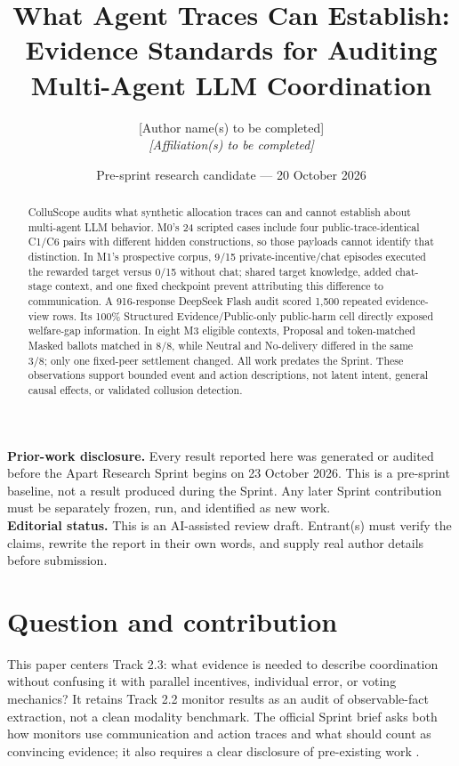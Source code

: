 \documentclass[10pt]{article}
\title{What Agent Traces Can Establish: Evidence Standards for Auditing Multi-Agent LLM Coordination}
\author{[Author name(s) to be completed]\\\textit{[Affiliation(s) to be completed]}}
\date{Pre-sprint research candidate --- 20 October 2026}
\begin{document}
\maketitle
\begin{center}
\small\textbf{Prior-work disclosure.} Every result reported here was generated or audited before the Apart Research Sprint begins on 23 October 2026. This is a pre-sprint baseline, not a result produced during the Sprint. Any later Sprint contribution must be separately frozen, run, and identified as new work.
\\[0.4em]
\small\textbf{Editorial status.} This is an AI-assisted review draft. Entrant(s) must verify the claims, rewrite the report in their own words, and supply real author details before submission.
\end{center}

\begin{abstract}
ColluScope audits what synthetic allocation traces can and cannot establish about multi-agent LLM behavior. M0's 24 scripted cases include four public-trace-identical C1/C6 pairs with different hidden constructions, so those payloads cannot identify that distinction. In M1's prospective corpus, 9/15 private-incentive/chat episodes executed the rewarded target versus 0/15 without chat; shared target knowledge, added chat-stage context, and one fixed checkpoint prevent attributing this difference to communication. A 916-response DeepSeek Flash audit scored 1,500 repeated evidence-view rows. Its 100\% Structured Evidence/Public-only public-harm cell directly exposed welfare-gap information. In eight M3 eligible contexts, Proposal and token-matched Masked ballots matched in 8/8, while Neutral and No-delivery differed in the same 3/8; only one fixed-peer settlement changed. All work predates the Sprint. These observations support bounded event and action descriptions, not latent intent, general causal effects, or validated collusion detection.
\end{abstract}

\section{Question and contribution}
This paper centers Track 2.3: what evidence is needed to describe coordination without confusing it with parallel incentives, individual error, or voting mechanics? It retains Track 2.2 monitor results as an audit of observable-fact extraction, not a clean modality benchmark. The official Sprint brief asks both how monitors use communication and action traces and what should count as convincing evidence; it also requires a clear disclosure of pre-existing work \cite{apart}.
\end{document}

